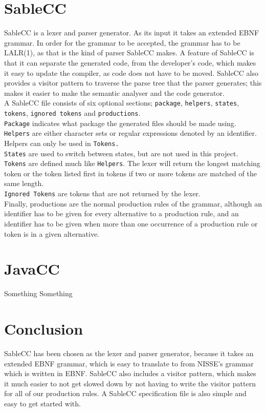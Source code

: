 \section{SableCC}
SableCC is a lexer and parser generator. As its input it takes an extended EBNF grammar. In order for the grammar to be accepted, the grammar has to be LALR(1), as that is the kind of parser SableCC makes. A feature of SableCC is that it can separate the generated code, from the developer's code, which makes it easy to update the compiler, as code does not have to be moved. SableCC also provides a visitor pattern to traverse the parse tree that the parser generates; this makes it easier to make the semantic analyser and the code generator.\\
A SableCC file consists of six optional sections; \texttt{package}, \texttt{helpers}, \texttt{states}, \texttt{tokens}, \texttt{ignored tokens} and \texttt{productions}.\\
\texttt{Package} indicates what package the generated files should be made using. \\
\texttt{Helpers} are either character sets or regular expressions denoted by an identifier. Helpers can only be used in \texttt{Tokens.} \\
\texttt{States} are used to switch between states, but are not used in this project. \\
\texttt{Tokens} are defined much like \texttt{Helpers}. The lexer will return the longest matching token or the token listed first in tokens if two or more tokens are matched of the same length. \\
\texttt{Ignored Tokens} are tokens that are not returned by the lexer. \\
Finally, productions are the normal production rules of the grammar, although an identifier has to be given for every alternative to a production rule, and an identifier has to be given when more than one occurrence of a production rule or token is in a given alternative.\\

\section{JavaCC}
Something Something


\section{Conclusion}
SableCC has been chosen as the lexer and parser generator, because it takes an extended EBNF grammar, which is easy to translate to from NISSE's grammar which is written in EBNF. SableCC also includes a visitor pattern, which makes it much easier to not get slowed down by not having to write the visitor pattern for all of our production rules. A SableCC specification file is also simple and easy to get started with.
